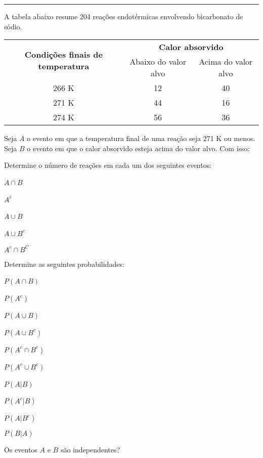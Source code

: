 \documentclass[a4paper,11pt,fleqn]{article}\usepackage[]{graphicx}\usepackage[]{color}
\theoremstyle{definition}
\begin{document}
\begin{compactenum}
\vspace{0.3cm}
\hrule
\vspace{0.3cm}

\item A tabela abaixo resume 204 reações endotérmicas envolvendo
  bicarbonato de sódio.
  \begin{table}[!h]
    \centering
    \begin{tabular}{ccc}
      \hline
      \multirow{2}{*}{\textbf{Condições finais de temperatura}}
      & \multicolumn{2}{c}{\textbf{Calor absorvido}} \\
      \cline{2-3}
                & Abaixo do valor alvo         & Acima do valor alvo \\
      \hline
      266 K      & 12           & 40           \\
      271 K      & 44           & 16           \\
      274 K      & 56           & 36           \\
      \hline
    \end{tabular}
  \end{table}

  Seja $A$ o evento em que a temperatura final de uma reação seja 271 K
  ou menos. Seja $B$ o evento em que o calor absorvido esteja acima do
  valor alvo. Com isso:
  \begin{compactenum}
  \item Determine o número de reações em cada um dos seguintes eventos: \\
    \begin{inparaenum}
    \item $A \cap B$ \,
    \item $A^c$ \,
    \item $A \cup B$ \,
    \item $A \cup B^c$ \,
    \item $A^c \cap B^C$
    \end{inparaenum}
  \item Determine as  seguintes probabilidades: \\
    \begin{inparaenum}
    \item $P(A \cap B)$ \,
    \item $P(A^c)$ \,
    \item $P(A \cup B)$ \,
    \item $P(A \cup B^c)$ \,
    \item $P(A^c \cap B^c)$ \,
    \item $P(A^c \cup B^c)$ \,
    \item $P(A|B)$ \,
    \item $P(A^c|B)$ \,
    \item $P(A|B^c)$ \,
    \item $P(B|A)$
    \end{inparaenum}
  \item Os eventos $A$ e $B$ são independentes?
  \end{compactenum}


\end{compactenum}
\end{document}
